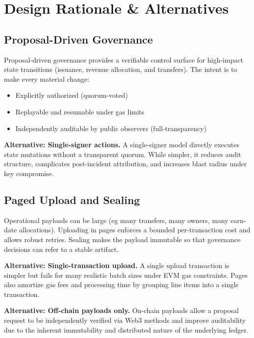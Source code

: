 \documentclass[10pt]{article}
\begin{document}
\clearpage
\section{Design Rationale \& Alternatives}

\subsection{Proposal-Driven Governance}
Proposal-driven governance provides a verifiable control surface for high-impact state transitions
(issuance, revenue allocation, and transfers). The intent is to make every material change:
\begin{itemize}
    \item Explicitly authorized (quorum-voted)
    \item Replayable and resumable under gas limits
    \item Independently auditable by public observers (full-transparency)
\end{itemize}

\textbf{Alternative: Single-signer actions.}
A single-signer model directly executes state mutations without a transparent quorum. While simpler, it reduces audit structure, complicates post-incident attribution, and increases blast radius under key compromise.

\subsection{Paged Upload and Sealing}
Operational payloads can be large (eg many transfers, many owners, many earn-date allocations). Uploading in pages enforces a bounded per-transaction cost and allows robust retries. Sealing makes the payload immutable so that governance decisions can refer to a stable artifact.

\textbf{Alternative: Single-transaction upload.} A single upload transaction is simpler but fails for many realistic batch sizes under EVM gas constraints. Pages also amortize gas fees and processing time by grouping line items into a single transaction.

\textbf{Alternative: Off-chain payloads only.} On-chain payloads allow a proposal request to be independently verified via Web3 methods and improve auditability due to the inherent immutability and distributed nature of the underlying ledger.
\end{document}
